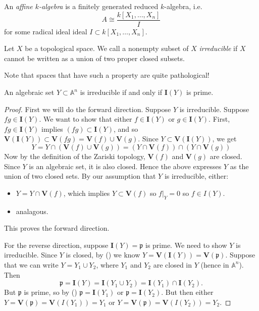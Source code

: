\documentclass[12pt]{article}
\begin{document}
\begin{definition}
	An \emph{affine $k$-algebra} is a finitely generated reduced $k$-algebra, i.e. 
	\begin{equation*}
		A \cong \frac{k[X_1,\dots,X_n]}{I}
	\end{equation*}
	for some radical ideal ideal $I\subset k[X_1,\dots, X_n]$.
\end{definition}

\begin{definition}
	Let $X$ be a topological space. We call a nonempty subset of $X$ \emph{irreducible} if $X$ cannot be written as a union of two proper closed subsets.
\end{definition}

\begin{remark}
	Note that spaces that have such a property are quite pathological!
\end{remark}

\begin{proposition}
\label{prop_y_irred_closed_then_iy_prime}
	An algebraic set $Y\subset\mathbb{A}^n$ is irreducible if and only if $\mathbf{I}(Y)$ is prime.
\end{proposition}
\begin{proof}
	First we will do the forward direction. Suppose $Y$ is irreducible. Suppose $fg\in \mathbf{I}(Y)$. We want to show that either $f\in \mathbf{I}(Y)$ or $g\in\mathbf{I}(Y)$. First, $fg\in\mathbf{I}(Y)$ implies $(fg)\subset\mathbf{I}(Y)$, and so $\mathbf{V}(\mathbf{I}(Y))\subset\mathbf{V}(fg)=\mathbf{V}(f)\cup\mathbf{V}(g)$. Since $Y\subset\mathbf{V}(\mathbf{I}(Y))$, we get 
	\begin{equation*}
		Y=Y\cap (\mathbf{V}(f)\cup\mathbf{V}(g))=(Y\cap\mathbf{V}(f))\cap(Y\cap \mathbf{V}(g))
	\end{equation*}
	Now by the definition of the Zariski topology, $\mathbf{V}(f)$ and $\mathbf{V}(g)$ are closed. Since $Y$ is an algebraic set, it is also closed. Hence the above expresses $Y$ as the union of two closed sets. By our assumption that $Y$ is irreducible, either:
	\begin{itemize}
		\item $Y=Y\cap\mathbf{V}(f)$, which implies $Y\subset\mathbf{V}(f)$ so $f|_Y=0$ so $f\in I(Y)$.
		\item analagous.
	\end{itemize}
	This proves the forward direction.

	For the reverse direction, suppose $\mathbf{I}(Y)=\mathfrak{p}$ is prime. We need to show $Y$ is irreducible. Since $Y$ is closed, by () we know $Y=\mathbf{V}(\mathbf{I}(Y))=\mathbf{V}(\mathfrak{p})$. Suppose that we can write $Y=Y_1\cup Y_2$, where $Y_1$ and $Y_2$ are closed in $Y$ (hence in $\mathbb{A}^n$). Then 
	\begin{equation*}
		\mathfrak{p}=\mathbf{I}(Y)=\mathbf{I}(Y_1\cup Y_2)=\mathbf{I}(Y_1)\cap\mathbf{I}(Y_2).
	\end{equation*}
	But $\mathfrak{p}$ is prime, so by () $\mathfrak{p}=\mathbf{I}(Y_1)$ or $\mathfrak{p}=\mathbf{I}(Y_2)$. But then either $Y=\mathbf{V}(\mathfrak{p})=\mathbf{V}(I(Y_1))=Y_1$ or $Y=\mathbf{V}(\mathfrak{p})=\mathbf{V}(I(Y_2))=Y_2$.
\end{proof}
\end{document}
